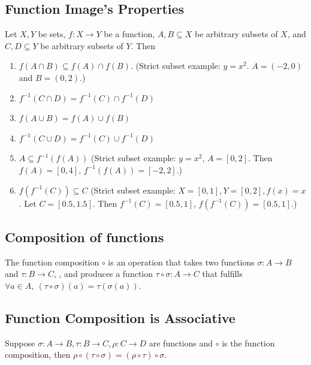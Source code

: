 \documentclass[11pt]{elegantbook}
\begin{document}
\subsection{Function Image's Properties}
\begin{theorem}
    Let $X,Y$ be sets, $f:X \rightarrow Y$ be a function, $A,B\subseteq X$ be arbitrary subsets of $X$, and $C,D\subseteq Y$ be arbitrary subsets of $Y$. Then
    \begin{enumerate}
        \item $f(A\cap B)\subseteq f(A)\cap f(B)$. (Strict subset example: $y=x^2$. $A=(-2,0)$ and $B=(0,2)$.)
        \item $f^{-1}(C\cap D)=f^{-1}(C)\cap f^{-1}(D)$
        \item $f(A\cup B)=f(A)\cup f(B)$
        \item $f^{-1}(C\cup D)=f^{-1}(C)\cup f^{-1}(D)$
        \item $A\subseteq f^{-1}(f(A))$ (Strict subset example: $y=x^2$, $A=[0,2]$. Then $f(A)=[0,4]$, $f^{-1}(f(A))=[-2,2]$.)
        \item $f(f^{-1}(C)) \subseteq C$ (Strict subset example: $X=[0,1], Y=[0,2], f(x)=x$. Let $C=[0.5,1.5]$. Then $f^{-1}(C)=[0.5,1]$, $f(f^{-1}(C))=[0.5,1]$.)
    \end{enumerate}
\end{theorem}

\subsection{Composition of functions}
\begin{definition}
\normalfont
The function composition $\circ$ is an operation that takes two functions $\sigma: A\rightarrow B$ and $\tau: B\rightarrow C$, , and produces a function $\tau\circ \sigma:A\rightarrow C$ that fulfills $\forall a\in A,\ (\tau\circ \sigma)(a)=\tau( \sigma(a))$.
\end{definition}

\subsection{Function Composition is Associative}
\begin{proposition}
    Suppose $\sigma:A \rightarrow B, \tau:B \rightarrow C, \rho:C \rightarrow D$ are functions and $\circ$ is the function composition, then $\rho\circ(\tau\circ\sigma)=(\rho\circ\tau)\circ\sigma$.
\end{proposition}
\end{document}
